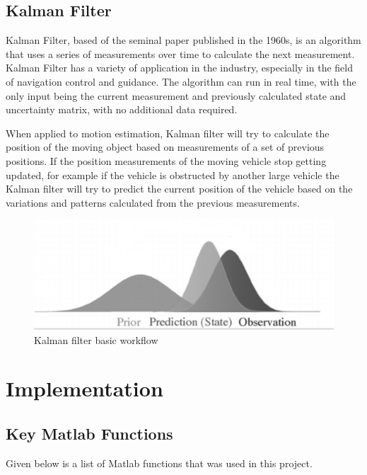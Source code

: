 \documentclass{article}
\begin{document}
	\subsection{Kalman Filter}
	
	Kalman Filter, based of the seminal paper published in the 1960s, is an algorithm that uses a series of measurements over time to calculate the next measurement. Kalman Filter has a variety of application in the industry, especially in the field of navigation control and guidance. The algorithm can run in real time, with the only input being the current measurement and previously calculated state and uncertainty matrix, with no additional data required.
	
	When applied to motion estimation, Kalman filter will try to calculate the position of the moving object based on measurements of a set of previous positions. If the position measurements of the moving vehicle stop getting updated, for example if the vehicle is obstructed by another large vehicle the Kalman filter will try to predict the current position of the vehicle based on the variations and patterns calculated from the previous measurements.
	
	\begin{figure}[!h]
		\centering
		\includegraphics[scale = 0.4]{figures/kf_diagram.png}
		\caption{Kalman filter basic workflow}
	\end{figure}
	
	\section{Implementation}
	
	\subsection{Key Matlab Functions}
	Given below is a list of Matlab functions that was used in this project.
	
\end{document}
